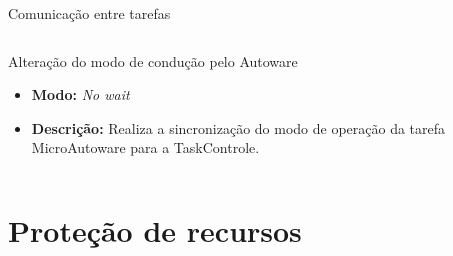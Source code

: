 \documentclass{if-beamer}
\begin{document}
\begin{frame}{Comunicação entre tarefas}
\begin{columns}
\begin{column}{0.55\textwidth}
\begin{block}{Alteração do modo de condução pelo Autoware}
\begin{itemize}
\begin{itemize}
				\end{itemize}
				\item \textbf{Modo:} \textit{No wait}
				\item \textbf{Descrição:} Realiza a sincronização do modo de operação da tarefa MicroAutoware para a TaskControle.
				
			\end{itemize}
			
		\end{block}
		
	\end{column}
	
\end{columns}

\end{frame}

\section{Proteção de recursos}
\end{document}
